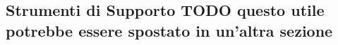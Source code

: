 






\subsection{Strumenti di Supporto TODO questo utile potrebbe essere spostato in un'altra sezione}

